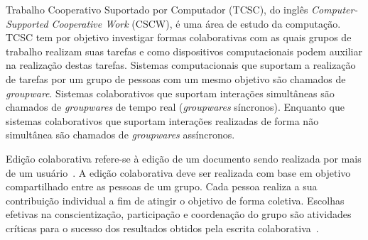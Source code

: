 Trabalho Cooperativo Suportado por Computador (TCSC), do inglês \textit{Computer-Supported Cooperative Work} (CSCW), é uma área de estudo da computação. TCSC tem por objetivo investigar formas colaborativas com as quais grupos de trabalho realizam suas tarefas e como dispositivos computacionais podem auxiliar na realização destas tarefas. Sistemas computacionais que suportam a realização de tarefas por um grupo de pessoas com um mesmo objetivo são chamados de \textit{groupware}. Sistemas colaborativos que suportam interações simultâneas são chamados de  \textit{groupwares} de tempo real (\textit{groupwares} síncronos). Enquanto que sistemas colaborativos que suportam interações realizadas de forma não simultânea são chamados de  \textit{groupwares} assíncronos.


Edição colaborativa refere-se à edição de um documento sendo realizada por mais de um usuário~\cite{DILLON-1993-Collaborative-Writing}. A edição colaborativa deve ser realizada com base em objetivo compartilhado entre as pessoas de um grupo. Cada pessoa realiza a sua contribuição individual a fim de atingir o objetivo de forma coletiva. Escolhas efetivas na conscientização, participação e coordenação do grupo são atividades críticas para o sucesso dos resultados obtidos pela escrita colaborativa~\cite{LOWRY-CURTIS-Taxonomy-2004-Collaborative_Writing}.

